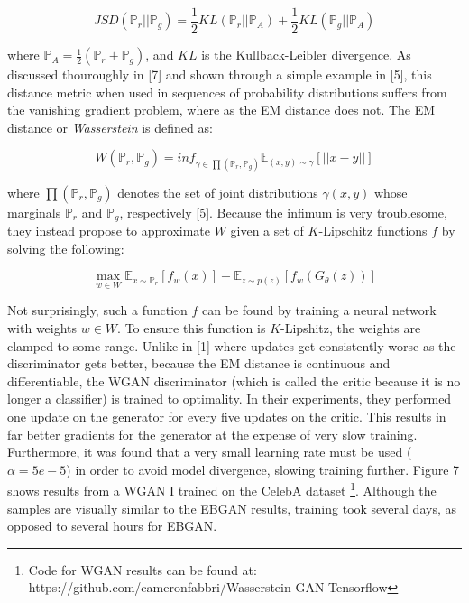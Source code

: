 \documentclass{article}
\begin{document}
\[JSD(\mathbb{P}_r||\mathbb{P}_g) = \frac{1}{2} KL(\mathbb{P}_r || \mathbb{P}_A) + \frac{1}{2}KL(\mathbb{P}_g || \mathbb{P}_A)\]

\noindent where $\mathbb{P}_A = \frac{1}{2}(\mathbb{P}_r + \mathbb{P}_g)$, and $KL$ is the Kullback-Leibler divergence. As discussed thouroughly in [7] and shown through a simple example
in [5], this distance metric when used in sequences of probability distributions suffers from the vanishing gradient problem, where as the EM distance does not. The EM distance or
\textit{Wasserstein} is defined as:

\[ W(\mathbb{P}_r, \mathbb{P}_g) = inf_{\gamma \in \prod (\mathbb{P}_r, \mathbb{P}_g)} \mathbb{E}_{({x,y})\sim \gamma} [ || x - y || ] \]

\noindent where $\prod (\mathbb{P}_r, \mathbb{P}_g)$ denotes the set of joint distributions $\gamma (x,y)$ whose marginals $\mathbb{P}_r$ and $\mathbb{P}_g$, respectively [5]. Because
the infimum is very troublesome, they instead propose to approximate $W$ given a set of $K$-Lipschitz functions $f$ by solving the following:

\[ \max\limits_{w \in W} \mathbb{E}_{x \sim \mathbb{P}_r}[f_w(x)] - \mathbb{E}_{z \sim p(z)}[f_w(G_{\theta}(z))]\]

\noindent Not surprisingly, such a function $f$ can be found by training a neural network with weights $w \in W$. To ensure this function is $K$-Lipshitz, the weights are clamped to some range.
Unlike in [1] where updates get consistently worse as the discriminator gets better, because the EM distance is continuous and differentiable, the WGAN discriminator (which is called the critic
because it is no longer a classifier) is trained to optimality. In their experiments, they performed one update on the generator for every five updates on the critic. This results in far better
gradients for the generator at the expense of very slow training. Furthermore, it was found that a very small learning rate must be used ($\alpha = 5e-5$) in order to avoid model divergence,
slowing training further. Figure 7 shows results from a WGAN I trained on the CelebA dataset \footnote{Code for WGAN results can be found at: https://github.com/cameronfabbri/Wasserstein-GAN-Tensorflow}.
Although the samples are visually similar to the EBGAN results, training took several days, as opposed to several hours for EBGAN. \newline
\end{document}
